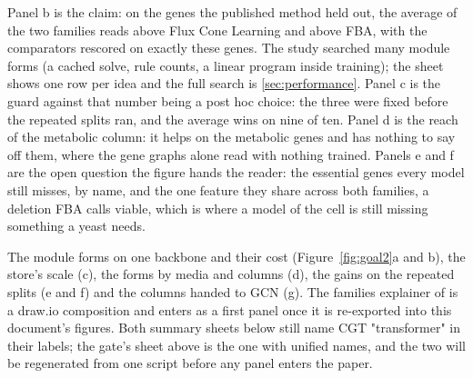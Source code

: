  Panel b is the claim: on the genes the published
method held out, the average of the two families reads above Flux Cone Learning and
above FBA, with the comparators rescored on exactly these genes. The study searched
many module forms (a cached solve, rule counts, a linear program inside training); the
sheet shows one row per idea and the full search is \ref{sec:performance}. Panel c is
the guard against that number being a post hoc choice: the three were fixed before the
repeated splits ran, and the average wins on nine of ten. Panel d is the reach of the
metabolic column: it helps on the metabolic genes and has nothing to say off them, where
the gene graphs alone read \ggengcnDegree{} with nothing trained. Panels e and f are
the open question the figure hands the reader: the essential genes every model still
misses, by name, and the one feature they share across both families, a deletion FBA
calls viable, which is where a model of the cell is still missing something a yeast
needs.

 The module forms on one backbone and
their cost (Figure~\ref{fig:goal2}a and b), the store's scale (c), the forms by media and
columns (d), the gains on the repeated splits (e and f) and the columns handed to GCN (g).
The families explainer of  is a draw.io composition and enters
as a first panel once it is re-exported into this document's figures. Both summary sheets
below still name CGT "transformer" in their labels; the gate's sheet above is the one
with unified names, and the two will be regenerated from one script before any panel
enters the paper.

